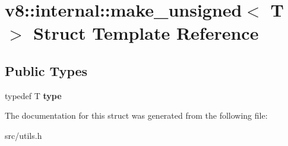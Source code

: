 \hypertarget{structv8_1_1internal_1_1make__unsigned}{}\section{v8\+:\+:internal\+:\+:make\+\_\+unsigned$<$ T $>$ Struct Template Reference}
\label{structv8_1_1internal_1_1make__unsigned}
\subsection*{Public Types}
\begin{DoxyCompactItemize}
\item 
\hypertarget{structv8_1_1internal_1_1make__unsigned_aeae3856d85550a0f3cd85202506128e9}{}typedef T {\bfseries type}\label{structv8_1_1internal_1_1make__unsigned_aeae3856d85550a0f3cd85202506128e9}

\end{DoxyCompactItemize}


The documentation for this struct was generated from the following file\+:\begin{DoxyCompactItemize}
\item 
src/utils.\+h\end{DoxyCompactItemize}
